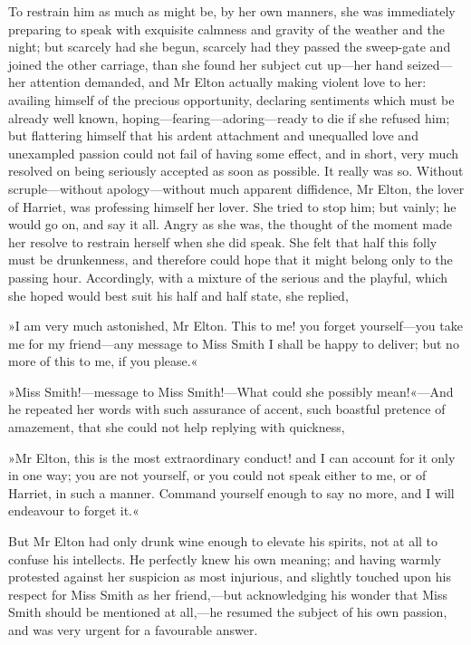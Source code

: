 To restrain him as much as might be, by her own manners, she was immediately preparing to speak with exquisite calmness and gravity of the weather and the night; but scarcely had she begun, scarcely had they passed the sweep-gate and joined the other carriage, than she found her subject cut up—her hand seized—her attention demanded, and Mr Elton actually making violent love to her: availing himself of the precious opportunity, declaring sentiments which must be already well known, hoping—fearing—adoring—ready to die if she refused him; but flattering himself that his ardent attachment and unequalled love and unexampled passion could not fail of having some effect, and in short, very much resolved on being seriously accepted as soon as possible. It really was so. Without scruple—without apology—without much apparent diffidence, Mr Elton, the lover of Harriet, was professing himself her lover. She tried to stop him; but vainly; he would go on, and say it all. Angry as she was, the thought of the moment made her resolve to restrain herself when she did speak. She felt that half this folly must be drunkenness, and therefore could hope that it might belong only to the passing hour. Accordingly, with a mixture of the serious and the playful, which she hoped would best suit his half and half state, she replied,

»I am very much astonished, Mr Elton. This to me! you forget yourself—you take me for my friend—any message to Miss Smith I shall be happy to deliver; but no more of this to me, if you please.«

»Miss Smith!—message to Miss Smith!—What could she possibly mean!«—And he repeated her words with such assurance of accent, such boastful pretence of amazement, that she could not help replying with quickness,

»Mr Elton, this is the most extraordinary conduct! and I can account for it only in one way; you are not yourself, or you could not speak either to me, or of Harriet, in such a manner. Command yourself enough to say no more, and I will endeavour to forget it.«

But Mr Elton had only drunk wine enough to elevate his spirits, not at all to confuse his intellects. He perfectly knew his own meaning; and having warmly protested against her suspicion as most injurious, and slightly touched upon his respect for Miss Smith as her friend,—but acknowledging his wonder that Miss Smith should be mentioned at all,—he resumed the subject of his own passion, and was very urgent for a favourable answer.

